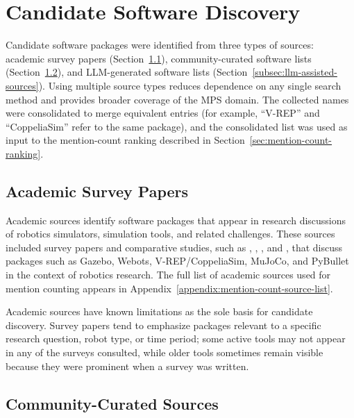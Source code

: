 \section{Candidate Software Discovery}
\label{sec:candidate-software-discovery}

Candidate software packages were identified from three types of sources: academic survey papers (Section~\ref{subsec:academic-sources}), community-curated software lists (Section~\ref{subsec:community-curated-sources}), and LLM-generated software lists (Section~\ref{subsec:llm-assisted-sources}). Using multiple source types reduces dependence on any single search method and provides broader coverage of the MPS domain. The collected names were consolidated to merge equivalent entries (for example, ``V-REP'' and ``CoppeliaSim'' refer to the same package), and the consolidated list was used as input to the mention-count ranking described in Section~\ref{sec:mention-count-ranking}.

\subsection{Academic Survey Papers}
\label{subsec:academic-sources}

Academic sources identify software packages that appear in research discussions of robotics simulators, simulation tools, and related challenges. These sources included survey papers and comparative studies, such as \citet{Harris2011}, \citet{collins2021simulators}, \citet{Korber2021}, and \citet{Farley2022}, that discuss packages such as Gazebo, Webots, V-REP/CoppeliaSim, MuJoCo, and PyBullet in the context of robotics research. The full list of academic sources used for mention counting appears in Appendix~\ref{appendix:mention-count-source-list}.

Academic sources have known limitations as the sole basis for candidate discovery. Survey papers tend to emphasize packages relevant to a specific research question, robot type, or time period; some active tools may not appear in any of the surveys consulted, while older tools sometimes remain visible because they were prominent when a survey was written.

\subsection{Community-Curated Sources}
\label{subsec:community-curated-sources}

